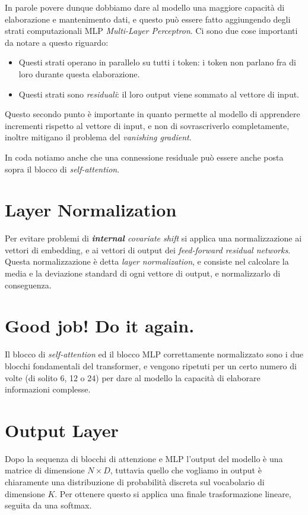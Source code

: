 In parole povere dunque dobbiamo dare al modello una maggiore capacità di elaborazione e mantenimento dati, e questo può essere fatto aggiungendo degli strati computazionali MLP \textit{Multi-Layer Perceptron}. Ci sono due cose importanti da notare a questo riguardo:

\begin{itemize}
    \item Questi strati operano in parallelo su tutti i token: i token non parlano fra di loro durante questa elaborazione.
    \item Questi strati sono \textit{residuali}: il loro output viene sommato al vettore di input.
\end{itemize}

Questo secondo punto è importante in quanto permette al modello di apprendere incrementi rispetto al vettore di input, e non di sovrascriverlo completamente, inoltre mitigano il problema del \textit{vanishing gradient}.

In coda notiamo anche che una connessione residuale può essere anche posta sopra il blocco di \textit{self-attention}.

\section{Layer Normalization}

Per evitare problemi di \textit{\textbf{internal} covariate shift} si applica una normalizzazione ai vettori di embedding, e ai vettori di output dei \textit{feed-forward residual networks}. Questa normalizzazione è detta \textit{layer normalization}, e consiste nel calcolare la media e la deviazione standard di ogni vettore di output, e normalizzarlo di conseguenza.

\section{Good job! Do it again.}

Il blocco di \textit{self-attention} ed il blocco MLP correttamente normalizzato sono i due blocchi fondamentali del transformer, e vengono ripetuti per un certo numero di volte (di solito 6, 12 o 24) per dare al modello la capacità di elaborare informazioni complesse.

\section{Output Layer}

Dopo la sequenza di blocchi di attenzione e MLP l'output del modello è una matrice di dimensione \(N \times D\), tuttavia quello che vogliamo in output è chiaramente una distribuzione di probabilità discreta sul vocabolario di dimensione \(K\). Per ottenere questo si applica una finale trasformazione lineare, seguita da una softmax.

